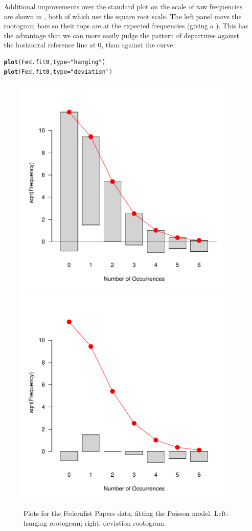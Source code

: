 \documentclass[11pt]{book}\usepackage[]{graphicx}\usepackage[]{color}
\makeatletter
\newcommand{\hlstr}[1]{\textcolor[rgb]{0.192,0.494,0.8}{#1}}%
\newcommand{\hlstd}[1]{\textcolor[rgb]{0.345,0.345,0.345}{#1}}%
\newcommand{\hlkwc}[1]{\textcolor[rgb]{0.333,0.667,0.333}{#1}}%
\newcommand{\hlkwd}[1]{\textcolor[rgb]{0.737,0.353,0.396}{\textbf{#1}}}%
\newenvironment{kframe}{%
 \def\at@end@of@kframe{}%
 \ifinner\ifhmode%
  \def\at@end@of@kframe{\end{minipage}}%
  \begin{minipage}{\columnwidth}%
 \fi\fi%
 \def\FrameCommand##1{\hskip\@totalleftmargin \hskip-\fboxsep
 \colorbox{shadecolor}{##1}\hskip-\fboxsep
     \hskip-\linewidth \hskip-\@totalleftmargin \hskip\columnwidth}%
 \MakeFramed {\advance\hsize-\width
   \@totalleftmargin\z@ \linewidth\hsize
   \@setminipage}}%
 {\par\unskip\endMakeFramed%
 \at@end@of@kframe}
\newenvironment{knitrout}{}{} %
\renewenvironment{knitrout}{\small\renewcommand{\baselinestretch}{.85}}{} %
\makeatother
\begin{document}
Additional improvements over the standard plot on the scale of raw
frequencies are shown in , both of which 
use the square root scale.  The left panel 
movs the rootogram bars so their tops
are at the expected frequencies (giving a ).
This has the advantage that we can more easily judge the pattern
of departures against the horizontal reference line at 0, than
against the curve.

\begin{knitrout}
\color{fgcolor}\begin{kframe}
\begin{alltt}
\hlkwd{plot}\hlstd{(Fed.fit0,} \hlkwc{type}\hlstd{=}\hlstr{"hanging"}\hlstd{)}
\hlkwd{plot}\hlstd{(Fed.fit0,} \hlkwc{type}\hlstd{=}\hlstr{"deviation"}\hlstd{)}
\end{alltt}
\end{kframe}\begin{figure}[htbp]


\centerline{\includegraphics[width=.48\textwidth]{ch03/fig/Fed0-plots21} 
\includegraphics[width=.48\textwidth]{ch03/fig/Fed0-plots22} }

\caption[Plots for the Federalist Papers data, fitting the Poisson model]{Plots for the Federalist Papers data, fitting the Poisson model. Left: hanging rootogram; right: deviation rootogram.\label{fig:Fed0-plots2}}
\end{figure}


\end{knitrout}
\end{document}
